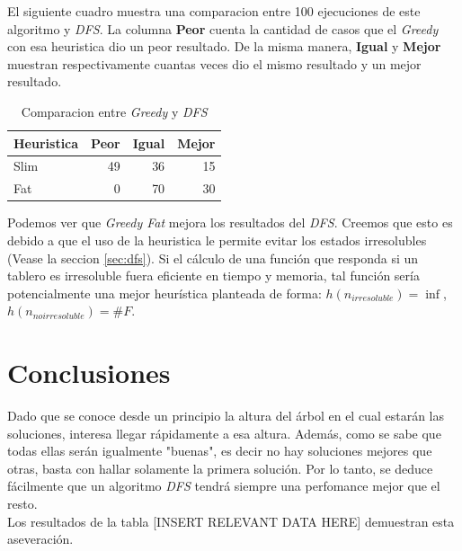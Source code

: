 \documentclass[a4paper,10pt]{article}
\begin{document}
    El siguiente cuadro muestra una comparacion entre 100 ejecuciones de este algoritmo y \textit{DFS}.
    La columna \textbf{Peor} cuenta la cantidad de casos que el \textit{Greedy} con esa heuristica dio un peor resultado.
    De la misma manera, \textbf{Igual} y \textbf{Mejor} muestran respectivamente cuantas veces dio el mismo resultado y un mejor resultado.

    \begin{table}[H]
        \label{greedy-dfs}

        \begin{center}
        \begin{tabular}{l|r|r|r}
            Heuristica & Peor & Igual & Mejor \\
            \hline
            Slim & 49 & 36 & 15 \\
            Fat & 0 & 70 & 30 \\
        \end{tabular}
        \end{center}
        \caption{Comparacion entre \textit{Greedy} y \textit{DFS}}

    \end{table}

    Podemos ver que \textit{Greedy Fat} mejora los resultados del \textit{DFS}.
    Creemos que esto es debido a que el uso de la heuristica le permite evitar los estados irresolubles (Vease la seccion \ref{sec:dfs}).
    Si el cálculo de una función que responda si un tablero es irresoluble fuera eficiente en tiempo y memoria, tal función sería potencialmente una mejor heurística planteada de forma: $h(n_{irresoluble}) = \inf$, $h(n_{no irresoluble}) = \#F$.

\section{Conclusiones}
    Dado que se conoce desde un principio la altura del árbol en el cual estarán las soluciones, interesa llegar rápidamente a esa altura. Además, como se sabe que todas ellas serán 
    igualmente "buenas", es decir no hay soluciones mejores que otras, basta con hallar solamente la primera solución. Por lo tanto, se deduce fácilmente que un algoritmo 
    \textit{DFS} tendrá siempre una perfomance mejor que el resto. \\

    Los resultados de la tabla [INSERT RELEVANT DATA HERE] demuestran esta aseveración. \\
\end{document}
